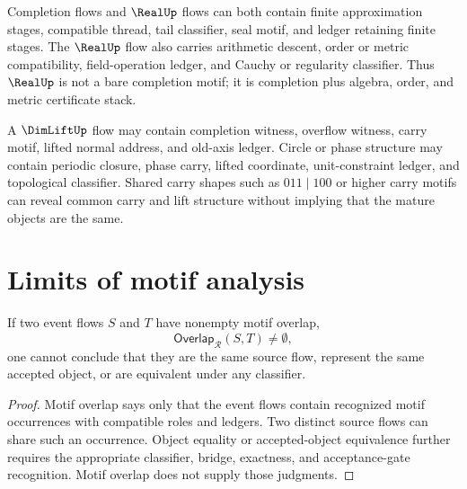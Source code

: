 \begin{example}
\label{ex:motif-generated-real-completion}
Completion flows and $\RealUp$ flows can both contain finite approximation stages, compatible thread, tail classifier, seal motif, and ledger retaining finite stages. The $\RealUp$ flow also carries arithmetic descent, order or metric compatibility, field-operation ledger, and Cauchy or regularity classifier. Thus $\RealUp$ is not a bare completion motif; it is completion plus algebra, order, and metric certificate stack.
\end{example}

\begin{example}
\label{ex:motif-generated-dimlift-circle}
A $\DimLiftUp$ flow may contain completion witness, overflow witness, carry motif, lifted normal address, and old-axis ledger. Circle or phase structure may contain periodic closure, phase carry, lifted coordinate, unit-constraint ledger, and topological classifier. Shared carry shapes such as $011\mid 100$ or higher carry motifs can reveal common carry and lift structure without implying that the mature objects are the same.
\end{example}

\section{Limits of motif analysis}
\label{sec:motif-generated-limits}

\begin{theorem}
\label{thm:motif-generated-similarity-not-equality}
If two event flows $S$ and $T$ have nonempty motif overlap,
$$
  \mathsf{Overlap}_{\mathcal R}(S,T)\neq\emptyset,
$$
one cannot conclude that they are the same source flow, represent the same accepted object, or are equivalent under any classifier.
\end{theorem}

\begin{proof}
Motif overlap says only that the event flows contain recognized motif occurrences with compatible roles and ledgers. Two distinct source flows can share such an occurrence. Object equality or accepted-object equivalence further requires the appropriate classifier, bridge, exactness, and acceptance-gate recognition. Motif overlap does not supply those judgments.
\end{proof}

